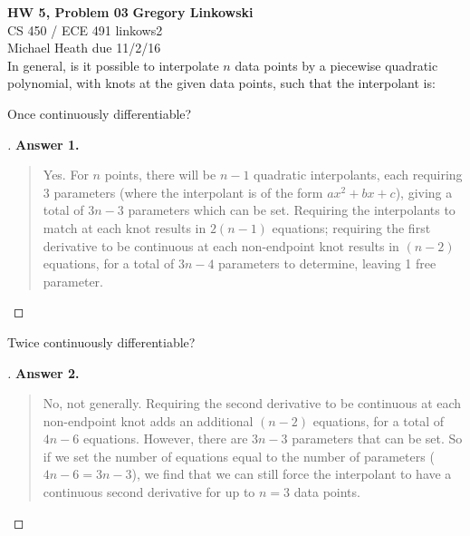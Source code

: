 \documentclass[12pt]{article}
\newenvironment{exercise}[2][Exercise]{\begin{trivlist}
\item[\hskip \labelsep {\bfseries #1}\hskip \labelsep {\bfseries #2.}]}{\end{trivlist}}
\begin{document}
\noindent
\large\textbf{HW 5, Problem 03} \hfill \textbf{Gregory Linkowski} \\
\normalsize CS 450 / ECE 491 \hfill linkows2 \\
Michael Heath \hfill due 11/2/16 \\


\vspace{5mm}
In general, is it possible to interpolate $n$ data points by a piecewise quadratic polynomial, with knots at the given data points, such that the interpolant is:
\vspace{-2mm} \\

\begin{exercise}{1}
	Once continuously differentiable?
\end{exercise} %
\begin{proof}[]
	\textbf{Answer 1.} %
	\begin{quote}
		Yes. For $n$ points, there will be $n-1$ quadratic interpolants, each requiring $3$ parameters (where the interpolant is of the form $ax^2 + bx + c$), giving a total of $3n-3$ parameters which can be set. Requiring the interpolants to match at each knot results in $2(n-1)$ equations; requiring the first derivative to be continuous at each non-endpoint knot results in $(n-2)$ equations, for a total of $3n-4$ parameters to determine, leaving 1 free parameter.
	\end{quote}
\end{proof}

\begin{exercise}{2}
	Twice continuously differentiable?
\end{exercise} %
\begin{proof}[]
	\textbf{Answer 2.} %
	\begin{quote}
		No, not generally. Requiring the second derivative to be continuous at each non-endpoint knot adds an additional $(n-2)$ equations, for a total of $4n-6$ equations. However, there are $3n-3$ parameters that can be set. So if we set the number of equations equal to the number of parameters ($4n-6 = 3n-3$), we find that we can still force the interpolant to have a continuous second derivative for up to $\boxed{n=3}$ data points.
	\end{quote}
\end{proof}
\end{document}
